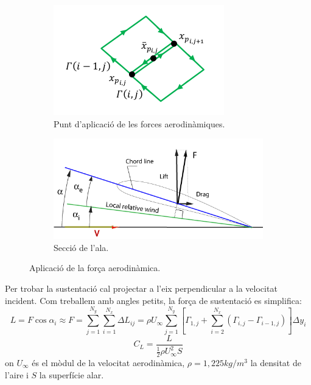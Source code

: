 \begin{figure}[H]
\centering
\begin{subfigure}{.5\textwidth}
  \centering
  \includegraphics[width=.7\linewidth]{./plots/xp}
  \caption{Punt d'aplicació de les forces aerodinàmiques.}
  \label{xp}
\end{subfigure}%
\begin{subfigure}{.5\textwidth}
  \centering
  \includegraphics[width=.93\linewidth]{./plots/Induced_effective}
  \caption{Secció de l'ala.}
  \label{fig:wingSec}
\end{subfigure}
\caption{Aplicació de la força aerodinàmica.}
\end{figure}
Per trobar la sustentació cal projectar a l'eix perpendicular a la velocitat incident. Com treballem amb angles petits, la força de sustentació es simplifica:
\begin{equation}
L=F\cos{\alpha_i} \approx F = \sum_{j=1}^{N_{y}}\sum_{i=1}^{N_{x}}\Delta L_{ij}=\rho U_{\infty}\sum_{j=1}^{N_{y}}\left[\Gamma_{1,j}+\sum_{i=2}^{N_{x}}\left(\Gamma_{i,j}-\Gamma_{i-1,j}\right)\right]\Delta y_{i}
\end{equation}
\begin{equation}
C_{L}=\frac{L}{\frac{1}{2}\rho U_{\infty}^{2}S}
\end{equation}
on $U_{\infty}$ és el mòdul de la velocitat aerodinàmica, $\rho=1,225 kg/m^{3}$ la densitat de l'aire i $S$ la superfície alar.

